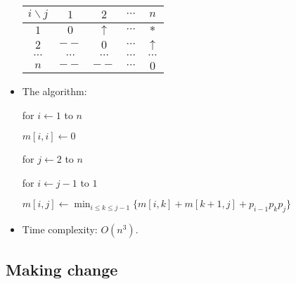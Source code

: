 \documentclass{article}
\begin{document}
\begin{itemize}
\begin{center}
\begin{tabular}{c|c|c|c|c}
$i\backslash j$ & $1$ & $2$ & $\cdots$ & $n$\\\hline
$1$ & $0$ & $\uparrow$ & $\cdots$ & $*$\\
$2$ & $--$ & $0$ & $\cdots$ & $\uparrow$\\
$\cdots$ & $\cdots$ & $\cdots$ & $\cdots$ & $\cdots$\\
$n$ & $--$ & $--$ & $\cdots$ & $0$\\
\end{tabular}
\end{center}

\item The algorithm:

\qquad for $i\leftarrow 1$ to $n$ 

\qquad\qquad $m[i,i]\leftarrow 0$

\qquad for $j\leftarrow 2$ to $n$

\qquad\qquad for $i\leftarrow j-1$ to $1$

\qquad\qquad\qquad $m[i,j]\leftarrow\min_{i\le k\le j-1}
\{m[i,k]+m[k+1,j]+p_{i-1}p_kp_j\}$

\item Time complexity: $O(n^3)$.

\end{itemize}

\subsection{Making change}
\end{document}
